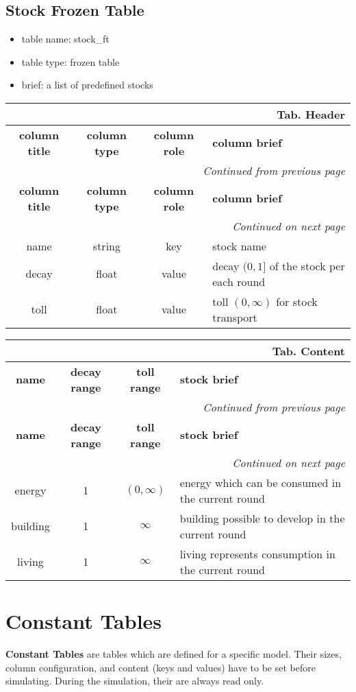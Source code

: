 \documentclass[a4paper,oneside,titlepage]{report}
\newcommand*{\LTHeaderIV}[5]{
  \multicolumn{4}{r}{\textbf{Tab. \thesubsection} \textbf{#1}}\\    
  \hline
  \textbf{#2} & \textbf{#3} & \textbf{#4} & \textbf{#5}\\
  \hline
  
  \endfirsthead
  \multicolumn{4}{r}{\textit{Continued from previous page}}\\    
  \hline
  \textbf{#2} & \textbf{#3} & \textbf{#4} & \textbf{#5}\\
  \hline
  \endhead
  \hline
  \multicolumn{4}{r}{\textit{Continued on next page}}\\
  \endfoot
  \hline
  \endlastfoot  
}
\begin{document}
\subsection{Stock Frozen Table}
\begin{itemize}
  \setlength{\itemsep}{0pt}
  \setlength{\parskip}{0pt}
\item table name: stock\_ft  
\item table type: frozen table   
\item brief: a list of predefined stocks
\end{itemize}
\label{stock_ft}

\vspace{-0.5cm}
\begin{longtable}{ |c|c|c|l| } 
  \LTHeaderIV{Header}{column title}{column type}{column role}{column brief}
  name & string & key & stock name\\
  decay & float & value & decay $(0, 1]$ of the stock per each round\\
  toll & float & value & toll $(0, \infty)$ for stock transport\\
\end{longtable}        

\vspace{-0.5cm}
\begin{longtable}{ |c|c|c|l| }    
  \LTHeaderIV{Content}{name}{decay range}{toll range}{stock brief}                    
  energy & 1 & $(0, \infty)$ & energy which can be consumed in the current round\\
  building & 1 & $\infty$ & building possible to develop in the current round\\
  living & 1 & $\infty$  & living represents consumption in the current round\\
\end{longtable}


\section{Constant Tables}
\textbf{Constant Tables} are tables which are defined for a specific model. Their sizes, column configuration, and content (keys and values) have to be set before simulating. During the simulation, their are always read only.

\end{document}
